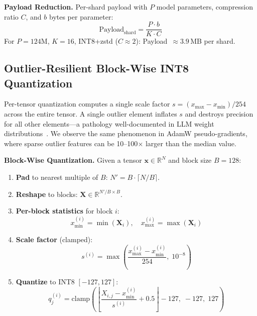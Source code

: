 \documentclass[10pt,conference]{IEEEtran}
\begin{document}
\textbf{Payload Reduction.} Per-shard payload with $P$ model parameters,
compression ratio $C$, and $b$ bytes per parameter:
\begin{equation}
  \text{Payload}_{\text{shard}} = \frac{P \cdot b}{K \cdot C}
  \label{eq:payload}
\end{equation}
For $P{=}124\text{M}$, $K{=}16$, INT8+zstd ($C{\approx}2$):
Payload~$\approx 3.9$\,MB per shard.

\subsection{Outlier-Resilient Block-Wise INT8 Quantization}
\label{sec:blockwise-int8}

Per-tensor quantization computes a single scale factor $s = (x_{\max} -
x_{\min})/254$ across the entire tensor. A single outlier element inflates
$s$ and destroys precision for all other elements---a pathology well-documented
in LLM weight distributions~\cite{dettmers2023qlora}. We observe the same
phenomenon in AdamW pseudo-gradients, where sparse outlier features can be
10--100$\times$ larger than the median value.

\textbf{Block-Wise Quantization.} Given a tensor $\mathbf{x} \in \mathbb{R}^N$
and block size $B{=}128$:

\begin{enumerate}
  \item \textbf{Pad} to nearest multiple of $B$:
    $N' = B \cdot \lceil N/B \rceil$.
  \item \textbf{Reshape} to blocks:
    $\mathbf{X} \in \mathbb{R}^{N'/B \times B}$.
  \item \textbf{Per-block statistics} for block $i$:
    \begin{equation}
      x_{\min}^{(i)} = \min(\mathbf{X}_i), \quad
      x_{\max}^{(i)} = \max(\mathbf{X}_i)
      \label{eq:block-stats}
    \end{equation}
  \item \textbf{Scale factor} (clamped):
    \begin{equation}
      s^{(i)} = \max\!\left(
        \frac{x_{\max}^{(i)} - x_{\min}^{(i)}}{254},\; 10^{-8}
      \right)
      \label{eq:scale}
    \end{equation}
  \item \textbf{Quantize} to INT8 $[-127, 127]$:
    \begin{equation}
      q_j^{(i)} = \text{clamp}\!\left(
        \left\lfloor \frac{X_{i,j} - x_{\min}^{(i)}}{s^{(i)}} + 0.5
        \right\rfloor - 127,\; {-}127,\; 127
      \right)
      \label{eq:quantize}
    \end{equation}
\end{enumerate}
\end{document}
